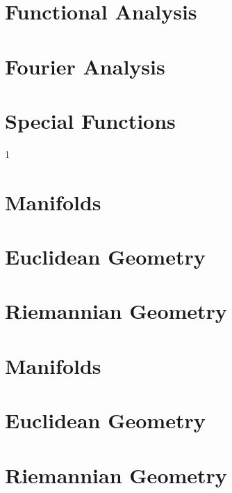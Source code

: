 \documentclass{book}                                                           %
\newcommand*{\TOPPATH}{books}
\newcommand*{\PATH}{\TOPPATH/}
\newcounter{endpage}
\def\compilegeometry{0}
\begin{document}
        \part{Functional Analysis}
        \part{Fourier Analysis}
        \part{Special Functions}
    \fi
    \clearpage

    \setcounter{endpage}{\thepage}
    \label{book:Geometry}%
    \renewcommand{\PATH}{\TOPPATH/Geometry}
    \setcounter{page}{\value{endpage}}

    \if\compilegeometry1
        \part{Manifolds}
            
        \part{Euclidean Geometry}
            
        \part{Riemannian Geometry}
            
    \else
        \part{Manifolds}
        \part{Euclidean Geometry}
        \part{Riemannian Geometry}
    \fi
    \clearpage

    \setcounter{endpage}{\thepage}
    \label{book:Geometric_Topology}%
    \renewcommand{\PATH}{\TOPPATH/Geometric_Topology}
    \setcounter{page}{\value{endpage}}
\end{document}
